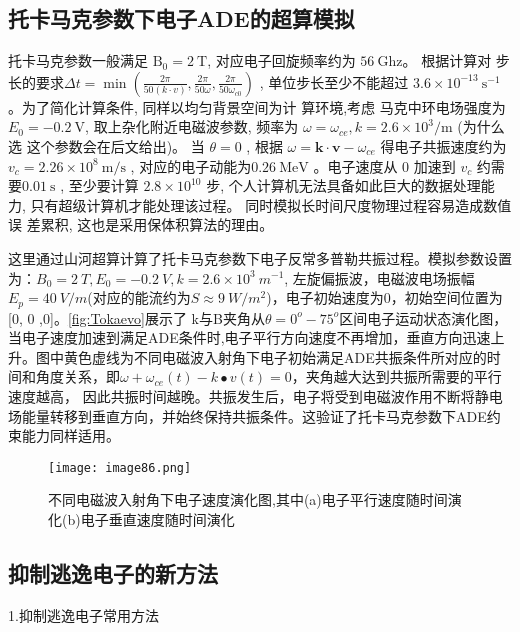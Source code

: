 \subsection{托卡马克参数下电子ADE的超算模拟}\label{sec:tokamakade}
托卡马克参数一般满足  $\mathrm{B}_{0}=2 ~\mathrm{T}$, 对应电子回旋频率约为 $ 56 ~\mathrm{Ghz} $。 根据计算对 步长的要求$  \Delta t=\min \left(\frac{2 \pi}{50(k \cdot v)}, \frac{2 \pi}{50 \omega}, \frac{2 \pi}{50 \omega_{c 0}}\right)$ , 单位步长至少不能超过 $ 3.6 \times 10^{-13} ~\mathrm{s^{-1}} $。为了简化计算条件, 同样以均匀背景空间为计 算环境,考虑 马克中环电场强度为$  E_{0}=-0.2 ~\mathrm{V} $,  取上杂化附近电磁波参数, 频率为  $\omega=\omega_{c e}, k=2.6 \times 10^{3} / \mathrm{m} $ (为什么选 这个参数会在后文给出)。 当 $ \theta=0$ , 根据 $ \omega=\boldsymbol{k} \cdot \boldsymbol{v}-\omega_{c e} $ 得电子共振速度约为$  v_{c}=2.26 \times 10^{8} ~\mathrm{m} / \mathrm{s}$ , 对应的电子动能为$  0.26 ~\mathrm{MeV} $ 。电子速度从 0 加速到  $v_{c}$  约需要$  0.01 ~\mathrm{s}$ , 至少要计算 $ 2.8 \times 10^{10} $ 步, 个人计算机无法具备如此巨大的数据处理能力, 只有超级计算机才能处理该过程。 同时模拟长时间尺度物理过程容易造成数值误 差累积, 这也是采用保体积算法的理由。\par
  这里通过山河超算计算了托卡马克参数下电子反常多普勒共振过程。模拟参数设置为：$B_0=2~T, E_0=-0.2~V, k=2.6×10^3~m^{-1}$, 左旋偏振波，电磁波电场振幅$E_p=40~V/m$(对应的能流约为$S\approx 9~W/m^2$)，电子初始速度为0，初始空间位置为[0, 0 ,0]。\autoref{fig:Tokaevo}展示了 k与B夹角从$θ=0^o-75^o$区间电子运动状态演化图，当电子速度加速到满足ADE条件时,电子平行方向速度不再增加，垂直方向迅速上升。图中黄色虚线为不同电磁波入射角下电子初始满足ADE共振条件所对应的时间和角度关系，即$ω+ω_{ce} (t)-k∙v(t)=0$，夹角越大达到共振所需要的平行速度越高，
因此共振时间越晚。共振发生后，电子将受到电磁波作用不断将静电场能量转移到垂直方向，并始终保持共振条件。这验证了托卡马克参数下ADE约束能力同样适用。

\begin{figure}
\centering
\texttt{[image: image86.png]}
\caption{\label{fig:Tokaevo}不同电磁波入射角下电子速度演化图,其中(a)电子平行速度随时间演化(b)电子垂直速度随时间演化}
\end{figure}

\subsection{抑制逃逸电子的新方法}
\par \noindent
1.抑制逃逸电子常用方法

